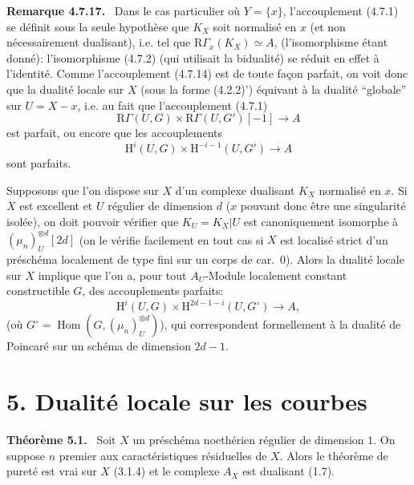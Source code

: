 \documentclass[11pt]{article}
\newenvironment{statement}[1]{\par\medskip\noindent\textbf{#1.}\ }{\par\medskip}
\renewcommand{\H}{\mathrm{H}}
\DeclareMathOperator{\Hom}{Hom}
\newcommand{\R}{\mathrm{R}}
\providecommand{\Hom}{\operatorname{Hom}}
\providecommand{\R}{\mathrm R}
\providecommand{\Hom}{\operatorname{Hom}}
\begin{document}
\begin{statement}{Remarque 4.7.17}
Dans le cas particulier où $Y=\{x\}$, l'accouplement (4.7.1) se définit sous la seule hypothèse que $K_X$ soit normalisé en $x$ (et non nécessairement dualisant), i.e. tel que $\R\Gamma_x(K_X)\simeq A$, (l'isomorphisme étant donné): l'isomorphisme (4.7.2) (qui utilisait la bidualité) se réduit en effet à l'identité. Comme l'accouplement (4.7.14) est de toute façon parfait, on voit donc que la dualité locale sur $X$ (sous la forme (4.2.2)') équivaut à la dualité ``globale'' sur $U=X-x$, i.e. au fait que l'accouplement (4.7.1)
\[
\R\Gamma(U,G)\times\R\Gamma(U,G')[-1]\longrightarrow A
\]
est parfait, ou encore que les accouplements
\[
\H^i(U,G)\times\H^{-i-1}(U,G')\longrightarrow A
\]
sont parfaits.

Supposons que l'on dispose sur $X$ d'un complexe dualisant $K_X$ normalisé en $x$. Si $X$ est excellent et $U$ régulier de dimension $d$ ($x$ pouvant donc être une singularité isolée), on doit pouvoir vérifier que $K_U=K_X|U$ est canoniquement isomorphe à $(\mu_n)_U^{\otimes d}[2d]$ (on le vérifie facilement en tout cas si $X$ est localisé strict d'un préschéma localement de type fini sur un corps de car.~0). Alors la dualité locale sur $X$ implique que l'on a, pour tout $A_U$-Module localement constant constructible $G$, des accouplements parfaits:
\[
\H^i(U,G)\times\H^{2d-1-i}(U,G^\circ)\longrightarrow A,
\]
(où $G^\circ=\Hom(G,(\mu_n)_U^{\otimes d})$), qui correspondent formellement à la dualité de Poincaré sur un schéma de dimension $2d-1$.
\end{statement}

\section*{5. Dualité locale sur les courbes}

\begin{statement}{Théorème 5.1}
Soit $X$ un préschéma noethérien régulier de dimension $1$. On suppose $n$ premier aux caractéristiques résiduelles de $X$. Alors le théorème de pureté est vrai sur $X$ (3.1.4) et le complexe $A_X$ est dualisant (1.7).
\end{statement}
\end{document}
